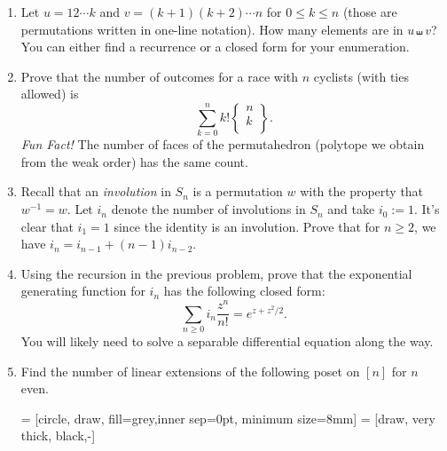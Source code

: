 \documentclass[11pt]{article}
\theoremstyle{definition}
\newcommand{\stirling}[2]{
  \displaystyle \left\{\begin{matrix}#1  \\#2  \\ \end{matrix}\right\}}
\begin{document}
\begin{enumerate}
\begin{enumerate}
\item Let $u=12\cdots k$ and $v=(k+1)(k+2)\cdots n$ for $0\leq k\leq n$ (those are permutations written in one-line notation).  How many elements are in $u\shuffle v$?  You can either find a recurrence or a closed form for your enumeration.


\item Prove that the number of outcomes for a race with $n$ cyclists (with ties allowed) is
\[
\displaystyle\sum_{k=0}^n k!\stirling{n}{k}.
\]
\emph{Fun Fact!} The number of faces of the permutahedron (polytope we obtain from the weak order) has the same count.

\item Recall that an \emph{involution} in $S_n$ is a permutation $w$ with the property that $w^{-1}=w$. Let $i_n$ denote the number of involutions in $S_n$ and take $i_0:=1$. It's clear that $i_1=1$ since the identity is an involution. Prove that for $n\geq 2$, we have $i_n=i_{n-1}+(n-1)i_{n-2}$.

\item Using the recursion in the previous problem, prove that the exponential generating function for $i_n$ has the following closed form:
\[
\sum_{n\geq 0}i_n\frac{z^n}{n!}=e^{z+z^2/2}.
\]
You will likely need to solve a separable differential equation along the way.

\item Find the number of linear extensions of the following poset on $[n]$ for $n$ even.

\bigskip

 = [circle, draw, fill=grey,inner sep=0pt, minimum size=8mm]
 = [draw, very thick, black,-]

\begin{center}
\end{center}


\end{enumerate}
\end{enumerate}
\end{document}
